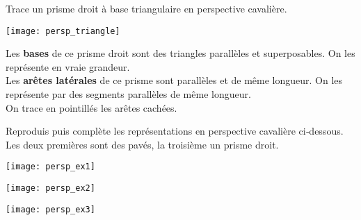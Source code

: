 \begin{methode*1}
 \begin{exemple*1}
Trace un prisme droit à base triangulaire en perspective cavalière. \\
 \begin{minipage}[c]{0.30\linewidth}
\texttt{[image: persp\_triangle]} 
  \end{minipage} \hfill%
  \begin{minipage}[c]{0.76\linewidth} 
Les \textcolor{H1}{\textbf{bases}} de ce prisme droit sont des triangles parallèles et superposables. On les représente en vraie grandeur. \\[0.5em]
Les \textcolor{C1}{\textbf{arêtes latérales}} de ce prisme sont parallèles et de même longueur. On les représente par des segments parallèles de même longueur. \\[0.5em]
On trace en pointillés les arêtes cachées. 
   \end{minipage}
 \end{exemple*1}

 \exercice  
Reproduis puis complète les représentations en perspective cavalière ci‑dessous. Les deux premières sont des pavés, la troisième un prisme droit. 
\begin{colenumerate}{3}
 \item
 
 \texttt{[image: persp\_ex1]} 
 \item
 
 \texttt{[image: persp\_ex2]} 
 \item 
 
 \texttt{[image: persp\_ex3]}
 \end{colenumerate}

 

 \end{methode*1}
 

